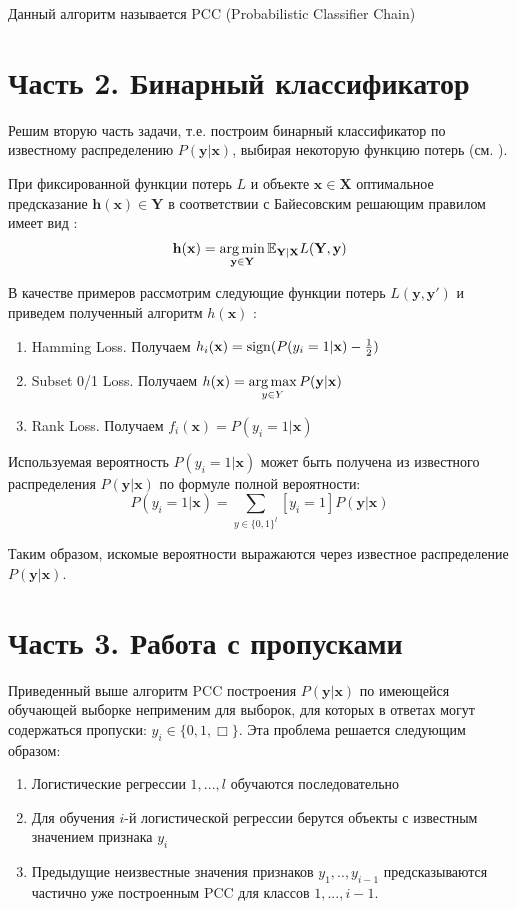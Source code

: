 \documentclass[12pt,twoside]{article}
\newcommand{\x}{\mathbf{x}}
\newcommand{\h}{\mathbf{h}}
\newcommand{\y}{\mathbf{y}}
\newcommand{\X}{\mathbf{X}}
\newcommand{\Y}{\mathbf{Y}}
\begin{document}
Данный алгоритм называется PCC (Probabilistic Classifier Chain) \cite{weiwei2010}

\section{Часть 2. Бинарный классификатор}
Решим вторую часть задачи, т.е. построим бинарный классификатор по известному распределению $P(\y|\x)$, выбирая некоторую функцию потерь (см. \cite{weiwei2010}).

При фиксированной функции потерь $L$ и объекте $\x\in\X$ оптимальное предсказание $\h(\x)\in\Y$ в соответствии с Байесовским решающим правилом имеет вид \cite{weiwei2010}:
$$\h(\x)=\argmin\limits_{\y\in\Y}\mathbb{E}_{\Y|\X}L(\Y,\y)$$


В качестве примеров рассмотрим следующие функции потерь $L(\y,\y')$ и приведем полученный алгоритм $h(\x)$ \cite{weiwei2010}:

\begin{enumerate}
\item Hamming Loss. Получаем $h_i(\x)=\sign(P(y_i=1|\x)-\frac{1}{2})$
\item Subset 0/1 Loss. Получаем $h(\x)=\argmax_{y\in Y}P(\y|\x)$
\item Rank Loss. Получаем $f_i(\x)=P(y_i=1|\x)$
\end{enumerate}

Используемая вероятность $P(y_i=1|\x)$ может быть получена из известного распределения $P(\y|\x)$ по формуле полной вероятности:
$$P(y_i=1|\x)=\sum\limits_{y\in \{0,1\}^l}[y_i=1]P(\y|\x)$$

Таким образом, искомые вероятности выражаются через известное распределение $P(\y|\x)$.

\section{Часть 3. Работа с пропусками}
Приведенный выше алгоритм PCC построения $P(\y|\x)$ по имеющейся обучающей выборке неприменим для выборок, для которых в ответах могут содержаться пропуски: $y_i\in\{0,1,\Box\}$. Эта проблема решается следующим образом:
\begin{enumerate}
\item Логистические регрессии $1,...,l$ обучаются последовательно
\item Для обучения $i$-й логистической регрессии берутся объекты с известным значением признака $y_i$
\item Предыдущие неизвестные значения признаков $y_1,..,y_{i-1}$ предсказываются частично уже построенным PCC для классов $1,...,{i-1}$.
\end{enumerate}
\end{document}
